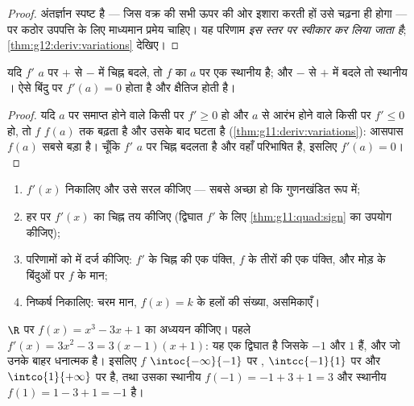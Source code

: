 \begin{proof}
अंतर्ज्ञान स्पष्ट है --- जिस वक्र की सभी  ऊपर की ओर इशारा करती
हों उसे चढ़ना ही होगा --- पर कठोर उपपत्ति के लिए माध्यमान प्रमेय चाहिए। यह
परिणाम \emph{इस स्तर पर स्वीकार कर लिया जाता है}; \cref{thm:g12:deriv:variations} देखिए।
\end{proof}

\begin{proposition}[चरम मान]\label{prop:g11:deriv:extrema}
यदि $f'$ $a$ पर $+$ से $-$ में चिह्न बदले, तो $f$ का $a$ पर एक
स्थानीय  है; और $-$ से $+$ में बदले तो स्थानीय । ऐसे बिंदु
पर $f'(a) = 0$ होता है और  क्षैतिज होती है।
\end{proposition}

\begin{proof}
यदि $a$ पर समाप्त होने वाले किसी  पर $f' \geq 0$ हो और $a$ से आरंभ होने
वाले किसी  पर $f' \leq 0$ हो, तो $f$ $f(a)$ तक बढ़ता है और उसके बाद घटता है
(\cref{thm:g11:deriv:variations}): आसपास $f(a)$ सबसे बड़ा है। चूँकि $f'$ $a$ पर चिह्न बदलता है और
वहाँ परिभाषित है, इसलिए $f'(a) = 0$।
\end{proof}

\begin{method}\label{met:g11:deriv:study}
\begin{enumerate}
  \item $f'(x)$ निकालिए और उसे सरल कीजिए --- सबसे अच्छा हो कि गुणनखंडित रूप
        में;
  \item हर  पर $f'(x)$ का चिह्न तय कीजिए (द्विघात $f'$ के लिए \cref{thm:g11:quad:sign}
        का उपयोग कीजिए);
  \item परिणामों को \emph{} में दर्ज कीजिए: $f'$ के चिह्न की
        एक पंक्ति, $f$ के तीरों की एक पंक्ति, और मोड़ के बिंदुओं पर $f$
        के मान;
  \item निष्कर्ष निकालिए: चरम मान, $f(x) = k$ के हलों की संख्या, असमिकाएँ।
\end{enumerate}
\end{method}

\begin{example}\label{ex:g11:deriv:study}
$\R$ पर $f(x) = x^3 - 3x + 1$ का अध्ययन कीजिए। पहले $f'(x) = 3x^2 - 3 = 3(x-1)(x+1)$: यह एक द्विघात है जिसके  $-1$
और $1$ हैं, और जो उनके बाहर धनात्मक है। इसलिए $f$ $\intoc{-\infty}{-1}$ पर ,
$\intcc{-1}{1}$ पर  और $\intco{1}{+\infty}$ पर  है, तथा उसका स्थानीय  $f(-1) = -1 + 3 + 1 = 3$ और
स्थानीय  $f(1) = 1 - 3 + 1 = -1$ है।
\end{example}

